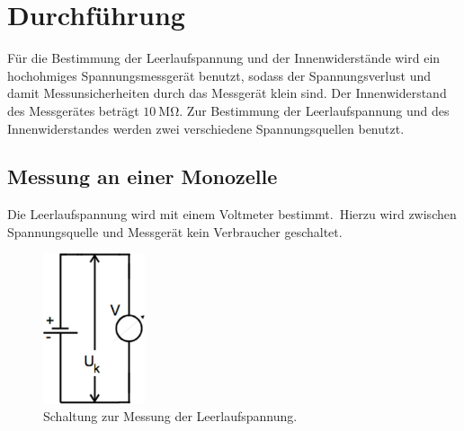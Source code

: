 \section{Durchführung}
\label{sec:Durchfuehrung}
Für die Bestimmung der Leerlaufspannung und der Innenwiderstände wird ein hochohmiges Spannungsmessgerät benutzt, sodass der Spannungsverlust und damit Messunsicherheiten durch das Messgerät klein sind.
Der Innenwiderstand des Messgerätes beträgt $\SI{10}{\mega\ohm}$.
Zur Bestimmung der Leerlaufspannung und des Innenwiderstandes werden zwei verschiedene Spannungsquellen benutzt.

\subsection{Messung an einer Monozelle}
\label{sec:drchf_monozelle}
Die Leerlaufspannung wird mit einem Voltmeter bestimmt.\
Hierzu wird zwischen Spannungsquelle und Messgerät kein Verbraucher geschaltet.
\begin{figure}
	\centering
	\includegraphics[width=3cm]{Bilder/Leerlauf.pdf}
	\caption{Schaltung zur Messung der Leerlaufspannung.\cite{V301}}
	\label{fig:leerlauf}
\end{figure}

